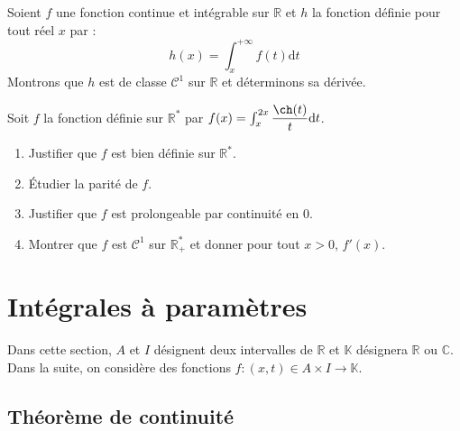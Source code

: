 \documentclass[french,11pt,twoside]{VcCours}
\newcommand{\dt}{\text{d}t}
\begin{document}
\newpage
\begin{Exemple} Soient $f$ une fonction continue et intégrable sur $\mathbb{R}$ et $h$ la fonction définie pour tout réel $x$ par :
$$ h(x) = \int_x^{+ \infty} f(t) \dt$$
Montrons que $h$ est de classe $\mathcal{C}^1$ sur $\mathbb{R}$ et déterminons sa dérivée.



\vspace{11.5cm}

\end{Exemple}

\begin{ApplicationDirecte}{} Soit $f$ la fonction définie sur $\mathbb{R}^*$ par $f(x) = \int_{x}^{2x} \dfrac{\ch(t)}{t} \dt$.

\begin{enumerate}
\item Justifier que $f$ est bien définie sur $\mathbb{R}^*$. 
\item Étudier la parité de $f$. 
\item Justifier que $f$ est prolongeable par continuité en $0$.
\item Montrer que $f$ est $\mathcal{C}^1$ sur $\mathbb{R}_+^{*}$ et donner pour tout $x>0$, $f'(x)$.
\end{enumerate}
\end{ApplicationDirecte}

\newpage
\section{Intégrales à paramètres}

Dans cette section, $A$ et $I$ désignent deux intervalles de $\mathbb{R}$ et $\mathbb{K}$ désignera $\mathbb{R}$ ou $\mathbb{C}$. Dans la suite, on considère des fonctions $f : (x,t) \in A \times I \rightarrow \mathbb{K}$.

\subsection{Théorème de continuité}
\end{document}
